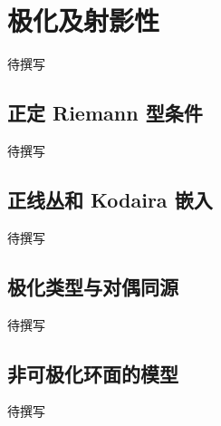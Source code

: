 
% 
% 

\section{极化及射影性}
\label{g4:sec:2103}

待撰写

\subsection{正定 Riemann 型条件}
\label{g4:subsec:2103:01}
待撰写

\subsection{正线丛和 Kodaira 嵌入}
\label{g4:subsec:2103:02}
待撰写

\subsection{极化类型与对偶同源}
\label{g4:subsec:2103:03}
待撰写

\subsection{非可极化环面的模型}
\label{g4:subsec:2103:04}
待撰写
